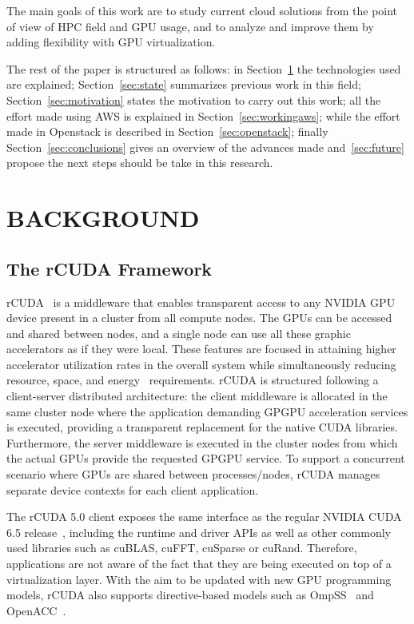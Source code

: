 \documentclass[a4paper,twoside]{article}
\begin{document}
The main goals of this work are to study current cloud solutions from 
the point of view of HPC field and GPU usage, and to analyze and improve 
them by adding flexibility with GPU virtualization.

The rest of the paper is structured as follows: 
in Section~\ref{sec:background} the technologies used are explained;
Section~\ref{sec:state} summarizes previous work in this field; 
Section~\ref{sec:motivation} states the motivation to carry out this work;
all the effort made using AWS is explained in Section~\ref{sec:workingaws};
while the effort made in Openstack is described in Section~\ref{sec:openstack};
finally Section~\ref{sec:conclusions} gives an overview of the advances made and~\ref{sec:future} propose the next steps
should be take in this research.

\section{\uppercase{Background}}
\label{sec:background}
\subsection{The rCUDA Framework}
\label{sec:rcuda}
{rCUDA}~\cite{tonithesis,toniparco} is a middleware that enables transparent access
to any NVIDIA GPU device present in a cluster from all compute
nodes. The GPUs can be accessed and shared between nodes, and a single node can use all these graphic accelerators
as if they were local.
These features are focused in attaining higher accelerator utilization rates in the overall system while simultaneously reducing
resource, space, and energy~\cite{energy14} requirements.
rCUDA is structured following a client-server distributed
architecture: the client middleware is allocated in the same cluster node where the application demanding GPGPU
acceleration services is executed, providing a transparent replacement for the
native CUDA libraries. Furthermore, the server middleware is executed in the
cluster nodes from which the actual GPUs provide the requested GPGPU service.
To support a concurrent scenario where GPUs are shared between
processes\slash nodes, {rCUDA} manages separate device contexts for
each client application.

The {rCUDA} 5.0 client exposes the same interface as the regular NVIDIA
CUDA 6.5 release~\cite{cuda65}, including the runtime and driver
APIs as well as other commonly used libraries such as cuBLAS, cuFFT, cuSparse or cuRand.
Therefore, applications are not aware of the fact that they are being executed
on top of a virtualization layer.
With the aim to be updated with new GPU programming models, {rCUDA} also supports
directive-based models such as OmpSS~\cite{repara15} and OpenACC~\cite{cluster15}.
\end{document}
